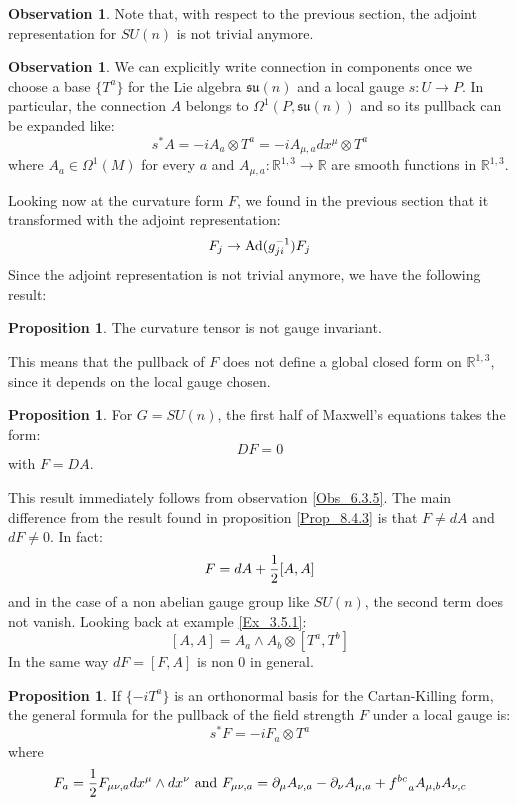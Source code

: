 \documentclass[12pt,a4paper]{report}
\theoremstyle{definition}
\theoremstyle{Theorem}
\newtheorem{Prop}[Def]{Proposition}
\theoremstyle{definition}
\theoremstyle{definition}
\newtheorem{Obs}[Def]{Observation}
\begin{document}
	\begin{Obs}
		Note that, with respect to the previous section, the adjoint representation for $SU(n)$ is not trivial anymore.
	\end{Obs}
	\begin{Obs}
		We can explicitly write connection in components once we choose a base $\{T^a\}$ for the Lie algebra $\mathfrak{su}(n)$ and a local gauge $s:U\rightarrow P$. In particular, the connection $A$ belongs to $\Omega^1(P,\mathfrak{su}(n))$ and so its pullback can be expanded like:
		$$s^*A=-iA_a\otimes T^a=-iA_{\mu,a}dx^\mu\otimes T^a$$
		where $A_a\in\Omega^1(M)$ for every $a$ and $A_{\mu,a}:\mathbb{R}^{1,3}\rightarrow\mathbb{R}$ are smooth functions in $\mathbb{R}^{1,3}$. 
	\end{Obs}
	Looking now at the curvature form $F$, we found in the previous section that it transformed with the adjoint representation:
	$$F_j\rightarrow \hbox{Ad}(g_{ji}^{-1})F_j$$ 
	Since the adjoint representation is not trivial anymore, we have the following result:
	\begin{Prop}
		The curvature tensor is not gauge invariant.
	\end{Prop}
	This means that the pullback of $F$ does not define a global closed form on $\mathbb{R}^{1,3}$, since it depends on the local gauge chosen.
	\begin{Prop}
		For $G=SU(n)$, the first half of Maxwell's equations takes the form:
		$$DF=0$$
		with $F=DA$.
	\end{Prop}
	This result immediately follows from observation \ref{Obs_6.3.5}. The main difference from the result found in proposition \ref{Prop_8.4.3} is that $F\neq dA$ and $dF\neq 0$. In fact:
	$$F=dA+{1\over 2}[A,A]$$
	and in the case of a non abelian gauge group like $SU(n)$, the second term does not vanish. Looking back at example \ref{Ex_3.5.1}:
	$$[A,A]=A_a\wedge A_b \otimes [T^a,T^b]$$ 
	In the same way $dF=[F,A]$ is non 0 in general.
	\begin{Prop}
		If $\{-iT^a\}$ is an orthonormal basis for the Cartan-Killing form, the general formula for the pullback of the field strength $F$ under a local gauge is:
		$$s^*F=-iF_{a}\otimes T^a$$
		where 
		$$F_a={1\over 2}F_{\mu\nu,a}dx^\mu\wedge dx^\nu \hbox{ and }F_{\mu\nu,a}=\partial_\mu A_{\nu,a}-\partial_\nu A_{\mu,a}+f^{bc}_{\hspace{9pt}a}A_{\mu,b}A_{\nu,c}$$
	\end{Prop}
\end{document}
